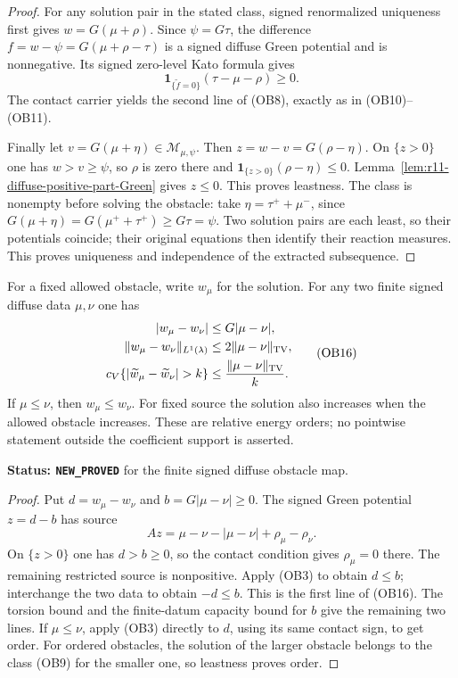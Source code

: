 \begin{proof}
For any solution pair in the stated class, signed renormalized
uniqueness first gives $w=G(\mu+\rho)$.  Since $\psi=G\tau$,
the difference $f=w-\psi=G(\mu+\rho-\tau)$ is a signed diffuse
Green potential and is nonnegative.  Its signed zero-level Kato
formula gives
\[
                  \mathbf1_{\{\widetilde f=0\}}
                              (\tau-\mu-\rho)\ge0.
\]
The contact carrier yields the second line of (OB8), exactly as in
(OB10)--(OB11).

Finally let $v=G(\mu+\eta)\in\mathscr M_{\mu,\psi}$.
Then $z=w-v=G(\rho-\eta)$.  On $\{z>0\}$ one has
$w>v\ge\psi$, so $\rho$ is zero there and
$\mathbf1_{\{z>0\}}(\rho-\eta)\le0$.
Lemma~\ref{lem:r11-diffuse-positive-part-Green} gives $z\le0$.
This proves leastness.  The class is nonempty before solving the
obstacle: take $\eta=\tau^++\mu^-$, since
$G(\mu+\eta)=G(\mu^++\tau^+)\ge G\tau=\psi$.
Two solution pairs are each least, so their potentials coincide;
their original equations then identify their reaction measures.
This proves uniqueness and independence of the extracted subsequence.
\end{proof}

\begin{theorem}
\label{thm:r11-diffuse-obstacle-stability}
For a fixed allowed obstacle, write $w_\mu$ for the solution.
For any two finite signed diffuse data $\mu,\nu$ one has
\[
 \begin{split}
 |w_\mu-w_\nu|&\le G|\mu-\nu|,\\
 \|w_\mu-w_\nu\|_{L^1(\lambda)}&\le2\|\mu-\nu\|_{\rm TV},\\
 c_V\{|\widetilde w_\mu-\widetilde w_\nu|>k\}
                              &\le\frac{\|\mu-\nu\|_{\rm TV}}{k}.
 \end{split}
 \tag{OB16}
\]
If $\mu\le\nu$, then $w_\mu\le w_\nu$.
For fixed source the solution also increases when the allowed
obstacle increases.  These are relative energy orders; no pointwise
statement outside the coefficient support is asserted.
\end{theorem}

\noindent\textbf{Status: \texttt{NEW\_PROVED}} for the finite
signed diffuse obstacle map.

\begin{proof}
Put $d=w_\mu-w_\nu$ and $b=G|\mu-\nu|\ge0$.
The signed Green potential $z=d-b$ has source
\[
            Az=\mu-\nu-|\mu-\nu|+\rho_\mu-\rho_\nu.
\]
On $\{z>0\}$ one has $d>b\ge0$, so the contact condition gives
$\rho_\mu=0$ there.  The remaining restricted source is
nonpositive.  Apply (OB3) to obtain $d\le b$; interchange the two
data to obtain $-d\le b$.  This is the first line of (OB16).
The torsion bound and the finite-datum capacity bound for $b$
give the remaining two lines.  If $\mu\le\nu$, apply (OB3)
directly to $d$, using its same contact sign, to get order.
For ordered obstacles, the solution of the larger obstacle belongs
to the class (OB9) for the smaller one, so leastness proves order.
\end{proof}

